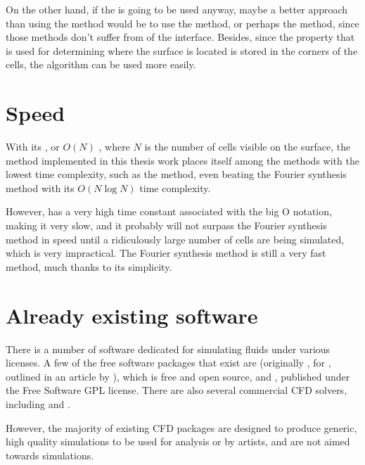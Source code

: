 On the other hand, if the \FVM is going to be used anyway, maybe a better approach than using the \VOF method would be to use the \LS method, or perhaps the \CLSVOF method, since those methods don't suffer from \diffusion of the interface. Besides, since the property that is used for determining where the surface is located is stored in the corners of the cells, the  algorithm can be used more easily.

\section{Speed}

With its , or $O(N)$ , where $N$ is the number of cells visible on the surface, the method implemented in this thesis work places itself among the methods with the lowest time complexity, such as the \LPD method, even beating the Fourier synthesis method with its $O(N \log N)$ time complexity.

However, \thismethod has a very high time constant associated with the big O notation, making it very slow, and it probably will not surpass the Fourier synthesis method in speed until a ridiculously large number of cells are being simulated, which is very impractical. The Fourier synthesis method is still a very fast method, much thanks to its simplicity.

\section{Already existing software}

There is a number of software dedicated for simulating fluids under various licenses. A few of the free \CFD software packages that exist are \OpenFOAM (originally , for \textit{}, outlined in an article by \citet{Weller1998}), which is free and open source, and \Gerris \citep{Popinet2003}, published under the Free Software GPL license. There are also several commercial CFD solvers, including \RealFlow and . %

However, the majority of existing CFD packages are designed to produce generic, high quality simulations to be used for analysis or by artists, and are not aimed towards \realtime simulations.

